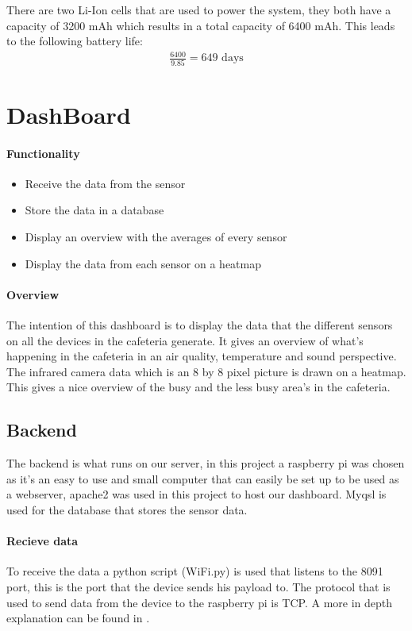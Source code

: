 \documentclass[11pt,a4paper]{article}
\begin{document}
There are two Li-Ion cells that are used to power the system, they both have a capacity of 3200 mAh which results in a total capacity of 6400 mAh. This leads to the following battery life:
\begin{gather*}
	\frac{6400}{9.85}=649 \text{ days}
\end{gather*}


\section{DashBoard}
\paragraph{Functionality}
\begin{itemize}
	\item Receive the data from the sensor
	\item Store the data in a database
	\item Display an overview with the averages of every sensor
	\item Display the data from each sensor on a heatmap
\end{itemize}

\paragraph{Overview}
The intention of this dashboard is to display the data that the different sensors on all the devices in the cafeteria generate.
It gives an overview of what's happening in the cafeteria in an air quality, temperature and sound perspective. 
The infrared camera data which is an 8 by 8 pixel picture is drawn on a heatmap. 
This gives a nice overview of the busy and the less busy area's in the cafeteria.  

\subsection{Backend}
The backend is what runs on our server, in this project a raspberry pi was chosen as it's an easy to use and small computer
 that can easily be set up to be used as a webserver, apache2 was used in this project to host our dashboard. Myqsl is used for the database that stores the sensor data.

\paragraph{Recieve data}
To receive the data a python script (WiFi.py) is used that listens to the 8091 port, this is the port that the device sends his payload to.
The protocol that is used to send data from the device to the raspberry pi is TCP. A more in depth explanation can be found in .
\end{document}
